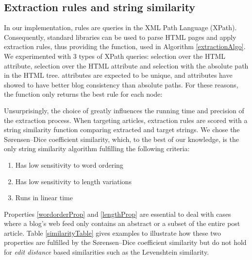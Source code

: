 \subsection{Extraction rules and string similarity}
\label{extractionrulesandstringsimilarity}

In our implementation, rules are queries in the XML Path Language (XPath). Consequently, standard libraries can be used to parse HTML pages and apply extraction rules, thus providing the  function, used in Algorithm \ref{extractionAlgo}. We experimented with 3 types of XPath queries: selection over the HTML  attribute, selection over the HTML  attribute and selection with the absolute path in the HTML tree.  attributes are expected to be unique, and  attributes have showed to have better blog consistency than absolute paths. For these reasons, the  function only returns the best rule for each node:

\allrulesAlgo

Unsurprisingly, the choice of  greatly influences the running time and precision of the extraction process. When targeting articles, extraction rules are scored with a string similarity function comparing extracted and target strings. We chose the Sørensen–Dice coefficient similarity\cite{dice1945}, which, to the best of our knowledge, is the only string similarity algorithm fulfilling the following criteria:

\begin{enumerate}
  \item\label{wordorderProp} Has low sensitivity to word ordering
  \item\label{lengthProp} Has low sensitivity to length variations
  \item\label{linearProp} Runs in linear time
\end{enumerate}

Properties \ref{wordorderProp} and \ref{lengthProp} are essential to deal with cases where a blog's web feed only contains an abstract or a subset of the entire post article. Table \ref{similarityTable} gives examples to illustrate how these two properties are fulfilled by the Sørensen–Dice coefficient similarity but do not hold for \emph{edit distance} based similarities such as the Levenshtein\cite{levenshtein1966} similarity.

